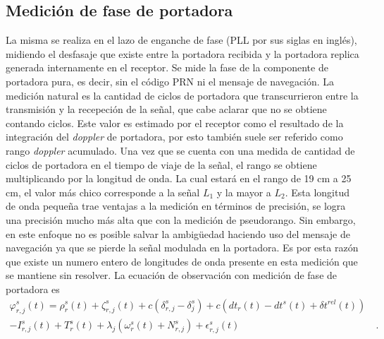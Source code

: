\documentclass[a4paper,12pt,oneside,onecolumn,final,openright]{book}%
\begin{document}
\subsection{Medición de fase de portadora}%
	La misma se realiza en el lazo de enganche de fase (PLL por sus siglas en inglés), midiendo el desfasaje que existe entre la portadora recibida y la portadora replica generada internamente en el receptor. Se mide la fase de la componente de portadora pura, es decir, sin el código PRN ni el mensaje de navegación. La medición natural es la cantidad de ciclos de portadora que transcurrieron entre la transmisión y la recepeción de la señal, que cabe aclarar que no se obtiene contando ciclos. Este valor es estimado por el receptor como el resultado de la integración del \textit{doppler} de portadora, por esto también suele ser referido como rango \textit{doppler} acumulado. Una vez que se cuenta con una medida de cantidad de ciclos de portadora en el tiempo de viaje de la señal, el rango se obtiene multiplicando por la longitud de onda. La cual estará en el rango de 19 cm a 25 cm, el valor más chico corresponde a la señal $L_1$ y la mayor a $L_2$. Esta longitud de onda pequeña trae ventajas a la medición en términos de precisión, se logra una precisión mucho más alta que con la medición de pseudorango. Sin embargo, en este enfoque no es posible salvar la ambigüedad haciendo uso del mensaje de navegación ya que se pierde la señal modulada en la portadora. Es por esta razón que existe un numero entero de longitudes de onda presente en esta medición que se mantiene sin resolver. La ecuación de observación con medición de fase de portadora es
\begin{align}\label{ec:obs_fasedep}
	\varphi _{r,j}^s(t) = \rho_r^s(t) + \zeta_{r,j}^s(t) + c\left( \delta_{r,j}^s - \delta_j^s \right) + c\left( dt_r(t) - dt^s(t) + \delta t^{rel}(t)\right) &\\ 
	- I_{r,j}^s(t) + T_r^s(t) + \lambda_j \left( \omega_r^s(t) + N_{r,j}^s \right) + \epsilon_{r,j}^s(t)& \ . \nonumber
\end{align}
\end{document}
